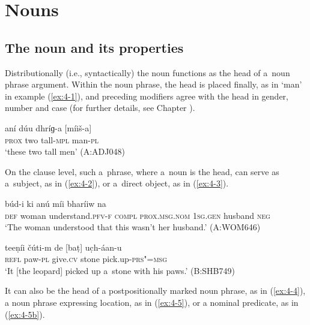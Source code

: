 \chapter{Nouns}
\label{chap:4}

\section{The noun and its properties}
\label{sec:4-1}


Distributionally (i.e., syntactically) the noun functions as the head of a~noun phrase argument. Within the noun phrase, the head is placed finally, as in `man' in example (\ref{ex:4-1}), and preceding modifiers agree with the head in gender, number and case (for further details, see Chapter ).


\begin{exe}
\ex
\label{ex:4-1}
\gll aní dúu dhríɡ-a [míiš-a] \\
	\textsc{prox} two tall-\textsc{mpl} man-\textsc{pl} \\
\glt `these two tall men' (A:ADJ048)
\end{exe}

On the clause level, such a~phrase, where a~noun is the head, can serve as a~subject, as in (\ref{ex:4-2}), or a~direct object, as in (\ref{ex:4-3}).

\begin{exe}
\ex
\label{ex:4-2}
\gll [se kúṛi] búd-i ki anú míi bharíiw na\\
	\textsc{def} woman understand.\textsc{pfv-f} \textsc{compl} \textsc{prox.msg.nom} \textsc{1sg.gen} husband \textsc{neg}\\
\glt `The woman understood that this wasn't her husband.' (A:WOM646)

\ex
\label{ex:4-3}
\gll teeṇíi čúti-m de [baṭ] uc̣h-áan-u \\
	\textsc{refl} paw-\textsc{pl} give.\textsc{cv} stone pick.up-\textsc{prs"=msg} \\
\glt `It [the leopard] picked up a~stone with his paws.' (B:SHB749)
\end{exe}

It can also be the head of a postpositionally marked noun phrase, as in (\ref{ex:4-4}), a noun phrase expressing location, as in (\ref{ex:4-5}), or a nominal predicate, as in (\ref{ex:4-5b}).

